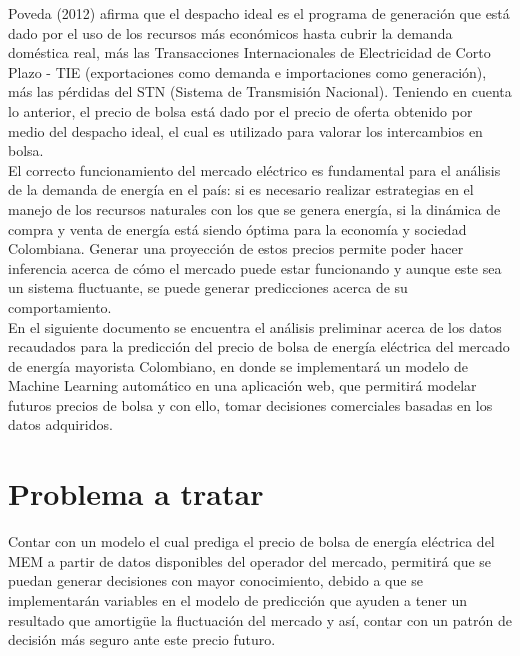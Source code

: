 \documentclass[conference, 10pt]{IEEEtran}
\begin{document}
Poveda (2012)\cite{b1} afirma que el despacho ideal es el programa de generación que está dado por el uso de los recursos más económicos hasta cubrir la demanda doméstica real, más las Transacciones Internacionales de Electricidad de Corto Plazo - TIE (exportaciones como demanda e importaciones como generación), más las pérdidas del STN (Sistema de Transmisión Nacional). Teniendo en cuenta lo anterior, el precio de bolsa está dado por el precio de oferta obtenido por medio del despacho ideal, el cual es utilizado para valorar los intercambios en bolsa.  \\
 
El correcto funcionamiento del mercado eléctrico es fundamental para el análisis de la demanda de energía en el país: si es necesario realizar estrategias en el manejo de los recursos  naturales con los que se genera energía, si la dinámica de compra y venta de energía está siendo óptima para la economía y sociedad Colombiana. Generar una proyección de estos precios permite poder hacer inferencia acerca de cómo el mercado puede estar funcionando y aunque este sea un sistema fluctuante, se puede generar predicciones acerca de su comportamiento.\\

En el siguiente documento se encuentra el análisis preliminar acerca de los datos recaudados para la predicción del precio de bolsa de energía eléctrica del mercado de energía mayorista Colombiano, en donde se implementará un modelo de Machine Learning automático en una aplicación web, que permitirá modelar futuros precios de bolsa y con ello, tomar decisiones comerciales basadas en los datos adquiridos.

\section{Problema a tratar} \label{sec:prob}
Contar con un modelo el cual prediga el precio de bolsa de energía eléctrica del MEM a partir de datos disponibles del operador del mercado, permitirá que se puedan generar decisiones con mayor conocimiento, debido a que se implementarán variables en el modelo de predicción que ayuden a tener un resultado que amortigüe la fluctuación del mercado y así, contar con un patrón de decisión más seguro ante este precio futuro.
\end{document}
